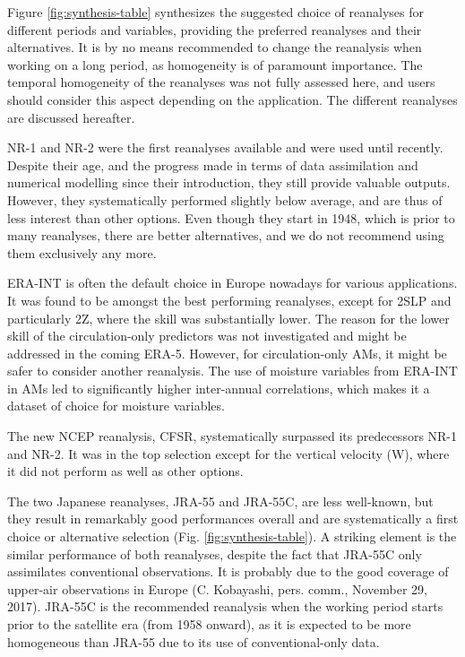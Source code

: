 \documentclass[smallextended]{svjour3}       %
\begin{document}
	Figure \ref{fig:synthesis-table} synthesizes the suggested choice of reanalyses for different periods and variables, providing the preferred reanalyses and their alternatives. It is by no means recommended to change the reanalysis when working on a long period, as homogeneity is of paramount importance. The temporal homogeneity of the reanalyses was not fully assessed here, and users should consider this aspect depending on the application. The different reanalyses are discussed hereafter.
	
	NR-1 and NR-2 were the first reanalyses available and were used until recently. Despite their age, and the progress made in terms of data assimilation and numerical modelling since their introduction, they still provide valuable outputs. However, they systematically performed slightly below average, and are thus of less interest than other options. Even though they start in 1948, which is prior to many reanalyses, there are better alternatives, and we do not recommend using them exclusively any more.
	
	ERA-INT is often the default choice in Europe nowadays for various applications. It was found to be amongst the best performing reanalyses, except for 2SLP and particularly 2Z, where the skill was substantially lower. The reason for the lower skill of the circulation-only predictors was not investigated and might be addressed in the coming ERA-5. However, for circulation-only AMs, it might be safer to consider another reanalysis. The use of moisture variables from ERA-INT in AMs led to significantly higher inter-annual correlations, which makes it a dataset of choice for moisture variables.
	
	The new NCEP reanalysis, CFSR, systematically surpassed its predecessors NR-1 and NR-2. It was in the top selection except for the vertical velocity (W), where it did not perform as well as other options.
	
	The two Japanese reanalyses, JRA-55 and JRA-55C, are less well-known, but they result in remarkably good performances overall and are systematically a first choice or alternative selection (Fig. \ref{fig:synthesis-table}). A striking element is the similar performance of both reanalyses, despite the fact that JRA-55C only assimilates conventional observations. It is probably due to the good coverage of upper-air observations in Europe (C. Kobayashi, pers. comm., November 29, 2017). JRA-55C is the recommended reanalysis when the working period starts prior to the satellite era (from 1958 onward), as it is expected to be more homogeneous than JRA-55 due to its use of conventional-only data.
	
\end{document}
